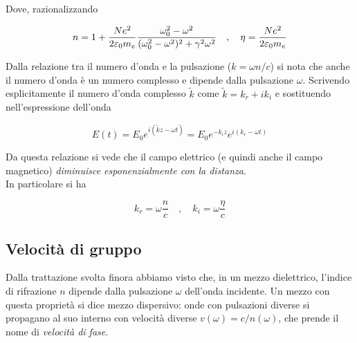 \newpage

Dove, razionalizzando 

\begin{tcolorbox}[colback=yellow!10!white, colframe=orange!70!black, boxrule=0.8pt]
\begin{equation}
    n = 1 + \frac{N e^2}{2 \varepsilon_0 m_e} \frac{\omega_0^2 - \omega^2}{(\omega_0^2 - \omega^2)^2 + \gamma^2 \omega^2} \quad , \quad \eta = \frac{N e^2}{2 \varepsilon_0 m_e}
\end{equation}
\end{tcolorbox}

Dalla relazione tra il numero d'onda e la pulsazione ($k = \omega n/c$) si nota che anche il numero d'onda è un numero complesso e dipende dalla pulsazione $\omega$. 
Scrivendo esplicitamente il numero d'onda complesso $\tilde{k}$ come $\tilde{k} = k_r + i k_i$ e sostituendo nell'espressione dell'onda

\begin{tcolorbox}[colback=yellow!10!white, colframe=orange!70!black, boxrule=0.8pt]
\begin{equation}
    E(t) = E_0 e^{i (\tilde{k} z - \omega t)} = E_0 e^{-k_i z} e^{i(k_r - \omega t)}
\end{equation}
\end{tcolorbox}

Da questa relazione si vede che il campo elettrico (e quindi anche il campo magnetico) \emph{diminuisce esponenzialmente con la distanza}. \\

In particolare si ha 

\begin{tcolorbox}[colback=yellow!10!white, colframe=orange!70!black, boxrule=0.8pt]
\begin{equation}
    k_r = \omega \frac{n}{c} \quad , \quad k_i = \omega \frac{\eta}{c}
\end{equation}
\end{tcolorbox}

\subsection{Velocità di gruppo}

Dalla trattazione svolta finora abbiamo visto che, in un mezzo dielettrico, l'indice di rifrazione $n$ dipende dalla pulsazione $\omega$ dell'onda incidente. Un mezzo con questa proprietà si dice mezzo dispersivo: onde con pulsazioni diverse si propagano al suo interno con velocità diverse $v(\omega) = c/n(\omega)$, che prende il nome di \emph{velocità di fase}.\\

